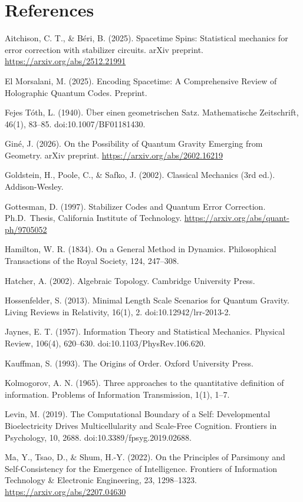 \documentclass[11pt,oneside]{report}
\theoremstyle{definition}
\theoremstyle{remark}
\newenvironment{reflist}
  {\par\small\setlength{\parindent}{0pt}%
   \setlength{\leftskip}{1.6em}\setlength{\parindent}{-1.6em}%
   \setlength{\parskip}{0.4em}%
   \raggedright\hyphenpenalty=50\exhyphenpenalty=50\relax
   \sloppy}
  {\par}
\begin{document}
\section*{References}
\begin{reflist}
Aitchison, C. T., \& Béri, B. (2025). Spacetime Spins: Statistical
mechanics for error correction with stabilizer circuits. arXiv preprint.
\url{https://arxiv.org/abs/2512.21991}

El Morsalani, M. (2025). Encoding Spacetime: A Comprehensive Review of
Holographic Quantum Codes. Preprint.

Fejes Tóth, L. (1940). Über einen geometrischen Satz. Mathematische
Zeitschrift, 46(1), 83--85. doi:10.1007/BF01181430.

Giné, J. (2026). On the Possibility of Quantum Gravity Emerging from
Geometry. arXiv preprint. \url{https://arxiv.org/abs/2602.16219}

Goldstein, H., Poole, C., \& Safko, J. (2002). Classical Mechanics (3rd
ed.). Addison-Wesley.

Gottesman, D. (1997). Stabilizer Codes and Quantum Error Correction.
Ph.D.~Thesis, California Institute of Technology.
\url{https://arxiv.org/abs/quant-ph/9705052}

Hamilton, W. R. (1834). On a General Method in Dynamics. Philosophical
Transactions of the Royal Society, 124, 247--308.

Hatcher, A. (2002). Algebraic Topology. Cambridge University Press.

Hossenfelder, S. (2013). Minimal Length Scale Scenarios for Quantum
Gravity. Living Reviews in Relativity, 16(1), 2.
doi:10.12942/lrr-2013-2.

Jaynes, E. T. (1957). Information Theory and Statistical Mechanics.
Physical Review, 106(4), 620--630. doi:10.1103/PhysRev.106.620.

Kauffman, S. (1993). The Origins of Order. Oxford University Press.

Kolmogorov, A. N. (1965). Three approaches to the quantitative
definition of information. Problems of Information Transmission, 1(1),
1--7.

Levin, M. (2019). The Computational Boundary of a Self: Developmental
Bioelectricity Drives Multicellularity and Scale-Free Cognition.
Frontiers in Psychology, 10, 2688. doi:10.3389/fpsyg.2019.02688.

Ma, Y., Tsao, D., \& Shum, H.-Y. (2022). On the Principles of Parsimony
and Self-Consistency for the Emergence of Intelligence. Frontiers of
Information Technology \& Electronic Engineering, 23, 1298--1323.
\url{https://arxiv.org/abs/2207.04630}


\end{reflist}
\end{document}
